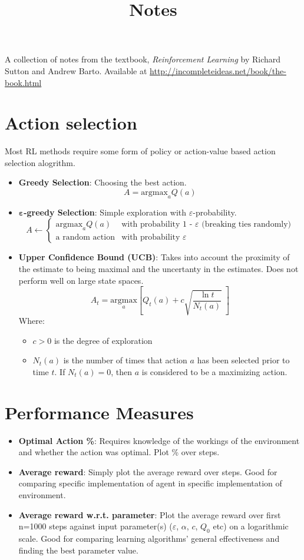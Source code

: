 \documentclass[12pt]{article}
\title{Notes}
\begin{document}
\maketitle
A collection of notes from the textbook, 
\textit{Reinforcement Learning} by Richard Sutton and Andrew Barto.
Available at \url{http://incompleteideas.net/book/the-book.html}

\section{Action selection}
Most RL methods require some form of policy or action-value based action selection alogrithm.
\begin{itemize}
\item\textbf{Greedy Selection}: Choosing the best action.
\[A = \text{argmax}_aQ(a) \]

\item$\boldsymbol\varepsilon$\textbf{-greedy Selection}: Simple exploration with $\varepsilon$-probability.
\[
	A\leftarrow
	\begin{cases}
		\text{argmax}_aQ(a) & \text{with probability 1 - $\varepsilon$ (breaking ties randomly)} \\
		\text{a random action} & \text{with probability } \varepsilon
	\end{cases}
\]
\item\textbf{Upper Confidence Bound (UCB)}: Takes into account the proximity of the estimate to being maximal and the uncertanty in the estimates. Does not perform well on large state spaces.
\[
	A_t=\underset{a}{\text{argmax}} 
	\left[
		Q_t(a) + c \sqrt{\frac{\ln{t}}{N_t(a)}}\;
	\right]
\]
Where:
	\begin{itemize}
		\item $c > 0$ is the degree of exploration
		\item $N_t(a)$ is the number of times that action $a$ has been selected prior to time $t$.
			If $N_t(a)=0$, then $a$ is considered to be a maximizing action.
	\end{itemize}
\end{itemize}

\section{Performance Measures}
\begin{itemize}
\item\textbf{Optimal Action \%}: Requires knowledge of the workings of the environment 
	and whether the action was optimal. Plot \% over steps.

\item\textbf{Average reward}: Simply plot the average reward over steps.
	Good for comparing specific implementation of agent in specific implementation of environment.

\item\textbf{Average reward w.r.t. parameter}: Plot the average reward over first n=1000 steps 
	against input parameter(s) ($\varepsilon$, $\alpha$, $c$, $Q_0$ etc) on a logarithmic scale.
	Good for comparing learning algorithms' general effectiveness and finding the best parameter value.

\end{itemize}
\end{document}
